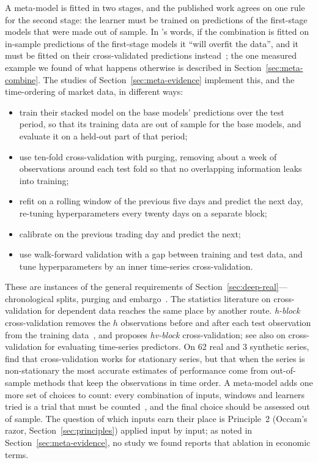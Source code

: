 A meta-model is fitted in two stages, and the published work agrees on one rule for the second stage: the
learner must be trained on predictions of the first-stage models that were made out of sample. In
\citeauthor{breiman1996stack}'s words, if the combination is fitted on in-sample predictions of the
first-stage models it ``will overfit the data'', and it must be fitted on their cross-validated predictions
instead~\citep{breiman1996stack}; the one measured example we found of what happens otherwise is
described in Section~\ref{sec:meta-combine}. The studies of Section~\ref{sec:meta-evidence} implement this, and the
time-ordering of market data, in different ways:
\begin{itemize}[leftmargin=1.5em,itemsep=2pt]
\item \citet{prata2024} train their stacked model on the base models' predictions over the test period, so
  that its training data are out of sample for the base models, and evaluate it on a held-out part of that
  period;
\item \citet{easley2021} use ten-fold cross-validation with purging, removing about a week of observations
  around each test fold so that no overlapping information leaks into training;
\item \citet{aitsahalia2026} refit on a rolling window of the previous five days and predict the next day,
  re-tuning hyperparameters every twenty days on a separate block;
\item \citet{munitoke2020ratio} calibrate on the previous trading day and predict the next;
\item \citet{bieganowski2026} use walk-forward validation with a gap between training and test data, and
  tune hyperparameters by an inner time-series cross-validation.
\end{itemize}
These are instances of the general requirements of Section~\ref{sec:deep-real}---chronological splits,
purging and embargo~\citep{lopezdeprado2018}. The statistics literature on cross-validation for dependent data
reaches the same place by another route. \emph{h-block} cross-validation removes the $h$ observations before and
after each test observation from the training data~\citep{burman1994}, and \citet{racine2000} proposes
\emph{hv-block} cross-validation; see also \citet{bergmeir2012} on cross-validation for evaluating time-series
predictors. On 62 real and 3 synthetic series, \citet{cerqueira2020} find that cross-validation works for
stationary series, but that when the series is non-stationary the most accurate estimates of performance come
from out-of-sample methods that keep the observations in time order. A meta-model adds one more set of choices to count: every
combination of inputs, windows and learners tried is a trial that must be counted~\citep{white2000,harvey2016}, and
the final choice should be assessed out of sample. The question of
which inputs earn their place is Principle~2 (Occam's razor, Section~\ref{sec:principles}) applied input by input; as noted in
Section~\ref{sec:meta-evidence}, no study we found reports that ablation in economic terms.

